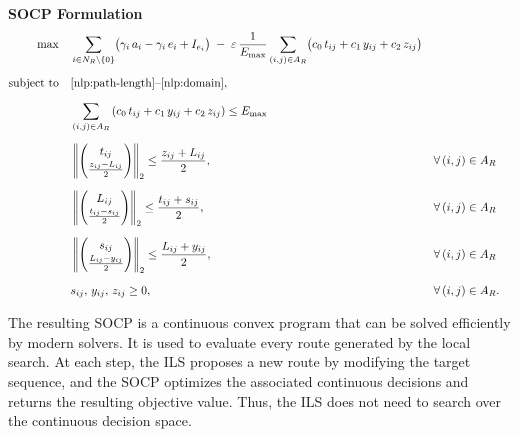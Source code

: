 \vspace{4mm}
\noindent\textbf{SOCP Formulation}
\begin{align}
\max \quad
& \sum_{i \in N_R \setminus \{0\}} \bigl(\gamma_i\, a_i - \gamma_i\, e_i + I_{e_i} \bigr)
\;-\; \varepsilon\, \frac{1}{E_{\max}}
\sum_{(i,j) \in A_R}
\bigl( c_0\, t_{ij} + c_1\, y_{ij} + c_2\, z_{ij} \bigr)
\label{socp:obj} \\[6pt]
\text{subject to} \quad
& \eqref{nlp:path-length}\text{--}\eqref{nlp:domain}, \notag \\[6pt]
& \sum_{(i,j) \in A_R}
\left( c_0\, t_{ij} + c_1\, y_{ij} + c_2\, z_{ij} \right)
\le E_{\max} \label{socp:energy} \\[6pt]
& \left\lVert
\begin{pmatrix}
t_{ij} \\[2pt]
\frac{z_{ij}-L_{ij}}{2}
\end{pmatrix}
\right\rVert_2
\le \frac{z_{ij}+L_{ij}}{2},
&& \forall\, (i,j) \in A_R \label{socp:cone-z} \\[6pt]
& \left\lVert
\begin{pmatrix}
L_{ij} \\[2pt]
\frac{t_{ij}-s_{ij}}{2}
\end{pmatrix}
\right\rVert_2
\le \frac{t_{ij}+s_{ij}}{2},
&& \forall\, (i,j) \in A_R \label{socp:cone-s} \\[6pt]
& \left\lVert
\begin{pmatrix}
s_{ij} \\[2pt]
\frac{L_{ij}-y_{ij}}{2}
\end{pmatrix}
\right\rVert_2
\le \frac{L_{ij}+y_{ij}}{2},
&& \forall\, (i,j) \in A_R \label{socp:cone-y} \\[6pt]
& s_{ij},\, y_{ij},\, z_{ij} \ge 0,
&& \forall\, (i,j) \in A_R. \notag
\end{align}

The resulting SOCP is a continuous convex program that can be solved efficiently by modern solvers. It is used to evaluate every route generated by the local search. At each step, the ILS proposes a new route by modifying the target sequence, and the SOCP optimizes the associated continuous decisions and returns the resulting objective value. Thus, the ILS does not need to search over the continuous decision space.

